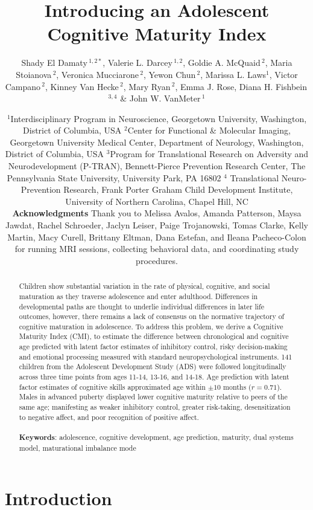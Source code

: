 \documentclass{article}%
\title{Introducing an Adolescent Cognitive Maturity Index}
\author{
\parbox{\linewidth}{\centering
Shady El Damaty\,$^{1,2*}$, Valerie L. Darcey\,$^{1,2}$, Goldie A. McQuaid\,$^{2}$, Maria Stoianova\,$^{2}$, Veronica Mucciarone\,$^{2}$, Yewon Chun\,$^{2}$, Marissa L. Laws$^{1}$, Victor Campano\,$^{2}$, Kinney Van Hecke\,$^{2}$, Mary Ryan\,$^{2}$, Emma J. Rose, Diana H. Fishbein\,$^{3,4}$ \& John W. VanMeter\,$^{1}$}
}
\date{\footnotesize{$^{1}$Interdisciplinary Program in Neuroscience, Georgetown University, Washington, District of Columbia, USA
$^{2}$Center for Functional \& Molecular Imaging, Georgetown University Medical Center, Department of Neurology, Washington, District of Columbia, USA
$^{3}$Program for Translational Research on Adversity and Neurodevelopment (P-TRAN), Bennett-Pierce Prevention Research Center, The Pennsylvania State University, University Park, PA 16802
$^{4}$ Translational Neuro-Prevention Research, Frank Porter Graham Child Development Institute, University of Northern Carolina, Chapel Hill, NC} \\  \vspace{5pt} \textbf{Acknowledgments}
Thank you to Melissa Avalos, Amanda Patterson, Maysa Jawdat, Rachel Schroeder, Jaclyn Leiser, Paige Trojanowski, Tomas Clarke, Kelly Martin, Macy Curell, Brittany Eltman, Dana Estefan, and Ileana Pacheco-Colon for running MRI sessions, collecting behavioral data, and coordinating study procedures. }
\begin{document}
\maketitle
\begin{abstract}
Children show substantial variation in the rate of physical, cognitive, and social maturation as they traverse adolescence and enter adulthood. Differences in developmental paths are thought to underlie individual differences in later life outcomes, however, there remains a lack of consensus on the normative trajectory of cognitive maturation in adolescence. To address this problem, we derive a Cognitive Maturity Index (CMI), to estimate the difference between chronological and cognitive age predicted with latent factor estimates of inhibitory control, risky decision-making and emotional processing measured with standard neuropsychological instruments. 141 children from the Adolescent Development Study (ADS) were followed longitudinally across three time points from ages 11-14, 13-16, and 14-18. Age prediction with latent factor estimates of cognitive skills approximated age within $\pm 10$ months ($r=0.71$). Males in advanced puberty displayed lower cognitive maturity relative to peers of the same age; manifesting as weaker inhibitory control, greater risk-taking, desensitization to negative affect, and poor recognition of positive affect.  \\ \\
\textbf{Keywords}: adolescence, cognitive development, age prediction, maturity, dual systems model, maturational imbalance mode
\end{abstract}
\section*{Introduction}
\end{document}
